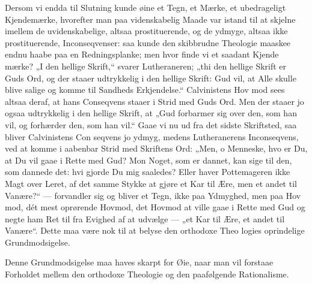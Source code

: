 \documentclass[12pt]{book}
\newcommand{\opage}[1]{\marginnote{\footnotesize\textit{[#1]}}}
\begin{document}
Dersom vi endda til Slutning kunde øine et Tegn,
et Mærke, et ubedrageligt Kjendemærke, hvorefter man
paa videnskabelig Maade var istand til at skjelne imellem
de uvidenskabelige, altsaa prostituerende, og de ydmyge,
altsaa ikke prostituerende, Inconseqvenser: saa kunde
den skibbrudne Theologie maaskee endnu haabe paa en
Redningsplanke; men hvor finde vi et saadant Kjende\-%
mærke? „I den hellige Skrift,“ svarer Lutheraneren; „thi
den hellige Skrift er Guds Ord, og der staaer udtrykkelig
i den hellige Skrift: Gud vil, at Alle skulle blive salige
og komme til Sandheds Erkjendelse.“ Calvinistens Hov\-%
mod sees altsaa deraf, at hans Conseqvens staaer i Strid
med Guds Ord. Men der staaer jo ogsaa udtrykkelig i
den hellige Skrift, at „Gud forbarmer sig over den, som
han vil, og forhærder den, som han vil.“ Gaae vi nu
ud fra det sidste Skriftsted, saa bliver Calvinistens Con\-%
seqvens jo ydmyg, medens Lutheranerens Inconseqvens,
\opage{250}\setcounter{footnote}{0}%
ved at komme i aabenbar Strid med Skriftens Ord: „Men,
o Menneske, hvo er Du, at Du vil gaae i Rette med Gud?
Mon Noget, som er dannet, kan sige til den, som dannede
det: hvi gjorde Du mig saaledes? Eller haver Pottemageren
ikke Magt over Leret, af det samme Stykke at gjøre et
Kar til Ære, men et andet til Vanære?“ --- forvandler sig
og bliver et Tegn, ikke paa Ydmyghed, men paa Hov\-%
mod, dét mest oprørende Hovmod, det Hovmod at ville
gaae i Rette med Gud og negte ham Ret til fra Evighed
af at udvælge --- „et Kar til Ære, et andet til Vanære“.
Dette maa være nok til at belyse den orthodoxe Theo\-%
logies oprindelige Grundmodsigelse.

Denne Grundmodsigelse maa haves skarpt for Øie,
naar man vil forstaae Forholdet mellem den orthodoxe
Theologie og den paafølgende Rationalisme.
\end{document}

